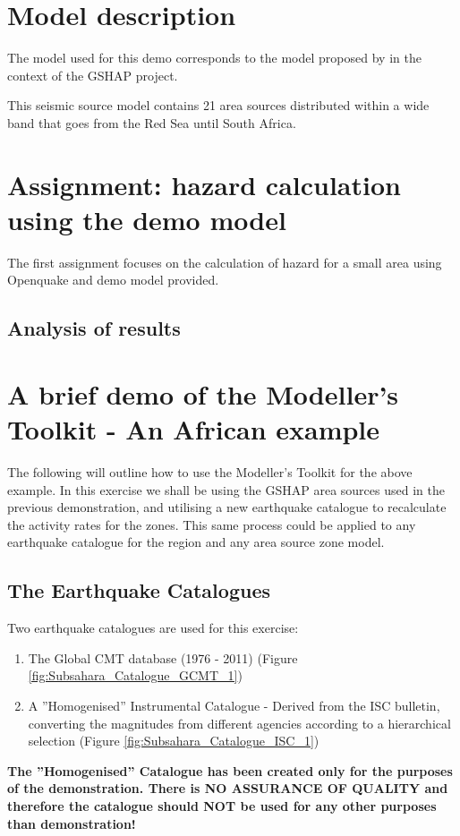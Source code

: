\section{Model description}

The model used for this demo corresponds to the model proposed by 
\citet{midzi1999} in the context of the GSHAP project.

This seismic source model contains 21 area sources distributed within a wide 
band that goes from the Red Sea until South Africa.

\section{Assignment: hazard calculation using the demo model}
The first assignment focuses on the calculation of hazard for a small area 
using Openquake and demo model provided.

\subsection{Analysis of results}


\section{A brief demo of the Modeller's Toolkit - An African example}

The following will outline how to use the Modeller's Toolkit for the above example. In this exercise we shall be using the GSHAP area sources used in the previous demonstration, and utilising a new earthquake catalogue to recalculate the activity rates for the zones. This same process could be applied to any earthquake catalogue for the region and any area source zone model. 

\subsection{The Earthquake Catalogues}

Two earthquake catalogues are used for this exercise:
\begin{enumerate}
\item The Global CMT database (1976 - 2011) (Figure \ref{fig:Subsahara_Catalogue_GCMT_1})
\item A ''Homogenised'' Instrumental Catalogue - Derived from the ISC bulletin, converting the magnitudes from different agencies according to a hierarchical selection (Figure \ref{fig:Subsahara_Catalogue_ISC_1})
\end{enumerate}
\textbf{The ''Homogenised'' Catalogue has been created only for the purposes of the demonstration. There is NO ASSURANCE OF QUALITY and therefore the catalogue should NOT be used for any other purposes than demonstration!}

